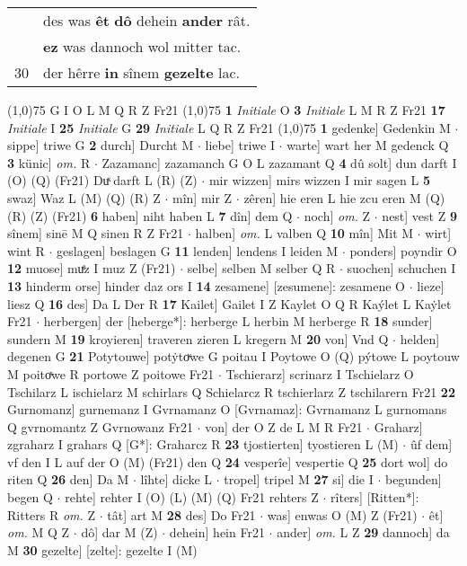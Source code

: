 \documentclass[8pt,a4paper,notitlepage]{article}
\begin{document}
\begin{table}[ht]
\begin{minipage}[t]{0.5\linewidth}
\begin{tabular}{rl}
 & des was \textbf{êt} \textbf{dô} dehein \textbf{ander} rât.\\ 
 & \textbf{ez} was dannoch wol mitter tac.\\ 
30 & der hêrre \textbf{in} sînem \textbf{gezelte} lac.\\ 
\end{tabular}
\scriptsize
\line(1,0){75} \newline
G I O L M Q R Z Fr21 \newline
\line(1,0){75} \newline
\textbf{1} \textit{Initiale} O  \textbf{3} \textit{Initiale} L M R Z Fr21  \textbf{17} \textit{Initiale} I  \textbf{25} \textit{Initiale} G  \textbf{29} \textit{Initiale} L Q R Z Fr21  \newline
\line(1,0){75} \newline
\textbf{1} gedenke] Gedenkin M  $\cdot$ sippe] triwe G \textbf{2} durch] Durcht M  $\cdot$ liebe] triwe I  $\cdot$ warte] wart her M gedenck Q \textbf{3} künic] \textit{om.} R  $\cdot$ Zazamanc] zazamanch G O L zazamant Q \textbf{4} dû solt] dun darft I (O) (Q) (Fr21) Duͯ darft L (R) (Z)  $\cdot$ mir wizzen] mirs wizzen I mir sagen L \textbf{5} swaz] Waz L (M) (Q) (R) Z  $\cdot$ mîn] mir Z  $\cdot$ zêren] hie eren L hie zcu eren M (Q) (R) (Z) (Fr21) \textbf{6} haben] niht haben L \textbf{7} dîn] dem Q  $\cdot$ noch] \textit{om.} Z  $\cdot$ nest] vest Z \textbf{9} sînem] sinē M Q sinen R Z Fr21  $\cdot$ halben] \textit{om.} L valben Q \textbf{10} mîn] Mit M  $\cdot$ wirt] wint R  $\cdot$ geslagen] beslagen G \textbf{11} lenden] lendens I leiden M  $\cdot$ ponders] poyndir O \textbf{12} muose] muͤz I muz Z (Fr21)  $\cdot$ selbe] selben M selber Q R  $\cdot$ suochen] schuchen I \textbf{13} hinderm orse] hinder daz ors I \textbf{14} zesamene] [zesumene]: zesamene O  $\cdot$ lieze] liesz Q \textbf{16} des] Da L Der R \textbf{17} Kailet] Gailet I Z Kaylet O Q R Kaýlet L Kaẏlet Fr21  $\cdot$ herbergen] der [heberge*]: herberge L herbin M herberge R \textbf{18} sunder] sundern M \textbf{19} kroyieren] traveren zieren L kregern M \textbf{20} von] Vnd Q  $\cdot$ helden] degenen G \textbf{21} Potytouwe] potẏtoͮwe G poitau I Poytowe O (Q) pýtowe L poytouw M poitoͯwe R portowe Z poitowe Fr21  $\cdot$ Tschierarz] scrinarz I Tschielarz O Tschilarz L ischielarz M schirlars Q Schielarcz R tschierlarz Z tschilarern Fr21 \textbf{22} Gurnomanz] gurnemanz I Gvrnamanz O [Gvrnamaz]: Gvrnamanz L gurnomans Q gvrnomantz Z Gvrnowanz Fr21  $\cdot$ von] der O Z de L M R Fr21  $\cdot$ Graharz] zgraharz I grahars Q [G*]: Graharcz R \textbf{23} tjostierten] tyostieren L (M)  $\cdot$ ûf dem] vf den I L auf der O (M) (Fr21) den Q \textbf{24} vesperîe] vespertie Q \textbf{25} dort wol] do riten Q \textbf{26} den] Da M  $\cdot$ lîhte] dicke L  $\cdot$ tropel] tripel M \textbf{27} si] die I  $\cdot$ begunden] begen Q  $\cdot$ rehte] rehter I (O) (L) (M) (Q) Fr21 rehters Z  $\cdot$ rîters] [Ritten*]: Ritters R \textit{om.} Z  $\cdot$ tât] art M \textbf{28} des] Do Fr21  $\cdot$ was] enwas O (M) Z (Fr21)  $\cdot$ êt] \textit{om.} M Q Z  $\cdot$ dô] dar M (Z)  $\cdot$ dehein] hein Fr21  $\cdot$ ander] \textit{om.} L Z \textbf{29} dannoch] da M \textbf{30} gezelte] [zelte]: gezelte I (M) \newline

\end{minipage}
\end{table}
\end{document}
